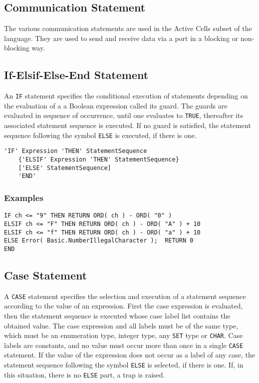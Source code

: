 \documentclass[a4wide,11pt]{article}
\begin{document}
\subsection{Communication Statement}
The various communication statements are used in the Active Cells subset of the language.
They are used to send and receive data via a port in a blocking or non-blocking way.

\subsection{If-Elsif-Else-End Statement}
An \lstinline"IF" statement specifies the conditional execution of statements depending on the evaluation of a a Boolean expression called its guard.
The guards are evaluated in sequence of occurrence, until one evaluates to \lstinline"TRUE", thereafter its associated statement sequence is executed.
If no guard is satisfied, the statement sequence following the symbol \lstinline"ELSE" is executed, if there is one.

\begin{lstlisting}[style=ebnf]
'IF' Expression 'THEN' StatementSequence
    {'ELSIF' Expression 'THEN' StatementSequence}
    ['ELSE' StatementSequence]
    'END'
\end{lstlisting}

\begin{annotation}
\subsubsection{Examples}
\begin{lstlisting}[style=example]
IF ch <= "9" THEN RETURN ORD( ch ) - ORD( "0" )
ELSIF ch <= "F" THEN RETURN ORD( ch ) - ORD( "A" ) + 10
ELSIF ch <= "f" THEN RETURN ORD( ch ) - ORD( "a" ) + 10
ELSE Error( Basic.NumberIllegalCharacter );  RETURN 0
END
\end{lstlisting}
\end{annotation}



\subsection{Case Statement}
A \lstinline"CASE" statement specifies the selection and execution of a statement sequence according to the value of an expression.
First the case expression is evaluated, then the statement sequence is executed whose case label list contains the obtained value.
The case expression and all labels must be of the same type, which must be an enumeration type, integer type, any \lstinline"SET" type or \lstinline"CHAR".
Case labels are constants, and no value must occur more than once in a single \lstinline"CASE" statement.
If the value of the expression does not occur as a label of any case, the statement sequence following the symbol \lstinline"ELSE" is selected, if there is one.
If, in this situation, there is no \lstinline"ELSE" part, a trap is raised.
\end{document}
